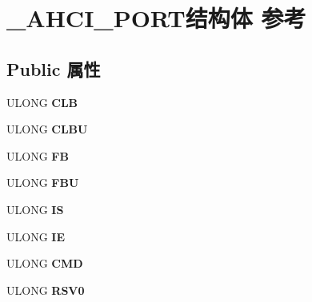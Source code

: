 \hypertarget{struct___a_h_c_i___p_o_r_t}{}\section{\+\_\+\+A\+H\+C\+I\+\_\+\+P\+O\+R\+T结构体 参考}
\label{struct___a_h_c_i___p_o_r_t}
\subsection*{Public 属性}
\begin{DoxyCompactItemize}
\item 
\mbox{\label{struct___a_h_c_i___p_o_r_t_a0a2173cba9ee4e02e7e75391c0252097}} 
U\+L\+O\+NG {\bfseries C\+LB}
\item 
\mbox{\label{struct___a_h_c_i___p_o_r_t_afa294a8e565276edd7091e37eddf67d3}} 
U\+L\+O\+NG {\bfseries C\+L\+BU}
\item 
\mbox{\label{struct___a_h_c_i___p_o_r_t_a3d386804fdb171a6034b58bf77c6a45f}} 
U\+L\+O\+NG {\bfseries FB}
\item 
\mbox{\label{struct___a_h_c_i___p_o_r_t_ad2cdf7cb817532886d71c18cb5cd0034}} 
U\+L\+O\+NG {\bfseries F\+BU}
\item 
\mbox{\label{struct___a_h_c_i___p_o_r_t_a336722960d261e22163910d0cad98181}} 
U\+L\+O\+NG {\bfseries IS}
\item 
\mbox{\label{struct___a_h_c_i___p_o_r_t_a327d9006c787dbf78c5cfb60c658b9db}} 
U\+L\+O\+NG {\bfseries IE}
\item 
\mbox{\label{struct___a_h_c_i___p_o_r_t_ae593b709d52c8aaea9ce198dbec7c063}} 
U\+L\+O\+NG {\bfseries C\+MD}
\item 
\mbox{\label{struct___a_h_c_i___p_o_r_t_a64eb1fd756095da840528f66b8f8d6a8}} 
U\+L\+O\+NG {\bfseries R\+S\+V0}
\item 
\mbox{\label{struct___a_h_c_i___p_o_r_t_ad624291894aa40c75c57e95c2bd361b0}} 

\end{DoxyCompactItemize}
